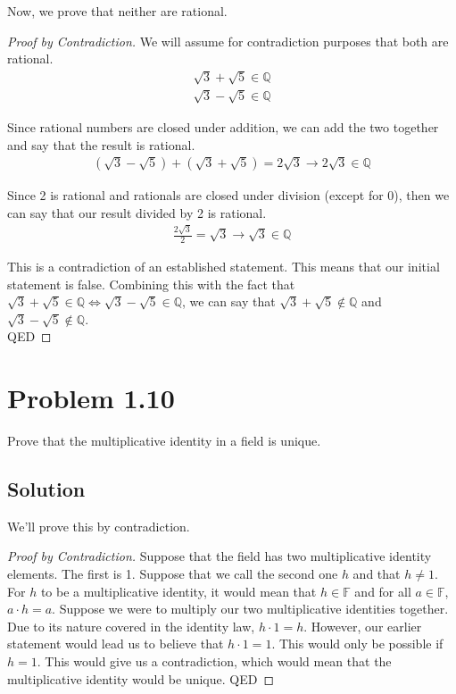 \documentclass[12pt]{report}
\begin{document}
Now, we prove that neither are rational.
\begin{proof}[Proof by Contradiction]
    We will assume for contradiction purposes that both are rational.
    \begin{gather}
        \sqrt{3} + \sqrt{5} \in \mathbb{Q}\\
        \sqrt{3} - \sqrt{5} \in \mathbb{Q}
    \end{gather}

    Since rational numbers are closed under addition, we can add the two together and say that the result is rational.
    \begin{gather}
        (\sqrt{3} - \sqrt{5}) + (\sqrt{3} + \sqrt{5}) = 2\sqrt{3} \rightarrow
        2\sqrt{3} \in \mathbb{Q}
    \end{gather}

    Since 2 is rational and rationals are closed under division (except for 0), then we can say that our result divided by 2 is rational.
    \begin{gather}
        \frac{2\sqrt{3}}{2} = \sqrt{3} \rightarrow
        \sqrt{3} \in \mathbb{Q}
    \end{gather}

    This is a contradiction of an established statement. 
    This means that our initial statement is false. 
    Combining this with the fact that $\sqrt{3} + \sqrt{5} \in \mathbb{Q} \iff \sqrt{3} - \sqrt{5} \in \mathbb{Q}$, we can say that $\sqrt{3} + \sqrt{5} \notin \mathbb{Q}$ and $\sqrt{3} - \sqrt{5} \notin \mathbb{Q}$.\\
    QED
\end{proof}

\pagebreak
\section{Problem 1.10}
Prove that the multiplicative identity in a field is unique. 

\subsection*{Solution}
We'll prove this by contradiction.
\begin{proof}[Proof by Contradiction]
    Suppose that the field has two multiplicative identity elements. 
    The first is 1.
    Suppose that we call the second one $h$ and that $h \neq 1$.
    For $h$ to be a multiplicative identity, it would mean that $h \in \mathbb{F}$ and for all $a \in \mathbb{F}$, $a \cdot h = a$.
    Suppose we were to multiply our two multiplicative identities together.
    Due to its nature covered in the identity law, $h \cdot 1 = h$.
    However, our earlier statement would lead us to believe that $h \cdot 1 = 1$.
    This would only be possible if $h = 1$.
    This would give us a contradiction, which would mean that the multiplicative identity would be unique.
    QED
\end{proof}
\end{document}

